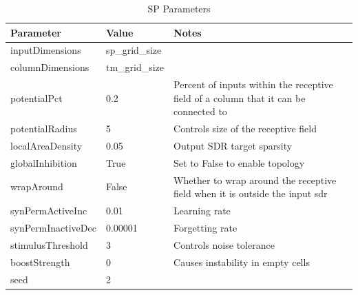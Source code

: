 \begin{table}[H]
    \centering
    \begin{tabularx}{\linewidth}{@{}XlX@{}}
        \toprule
        \textbf{Parameter} & \textbf{Value} & \textbf{Notes}                                                                       \\
        \midrule
        inputDimensions    & sp\_grid\_size &                                                                                      \\
        columnDimensions   & tm\_grid\_size &                                                                                      \\
        potentialPct       & 0.2            & Percent of inputs within the receptive field of a column that it can be connected to \\
        potentialRadius    & 5              & Controls size of the receptive field                                                 \\
        localAreaDensity   & 0.05           & Output SDR target sparsity                                                           \\
        globalInhibition   & True           & Set to False to enable topology                                                      \\
        wrapAround         & False          & Whether to wrap around the receptive field when it is outside the input \gls*{sdr}   \\
        synPermActiveInc   & 0.01           & Learning rate                                                                        \\
        synPermInactiveDec & 0.00001        & Forgetting rate                                                                      \\
        stimulusThreshold  & 3              & Controls noise tolerance                                                             \\
        boostStrength      & 0              & Causes instability in empty cells                                                    \\
        seed               & 2              &                                                                                      \\
        \bottomrule
    \end{tabularx}
    \caption{SP Parameters}
    \label{tab:surveillance_sp}
\end{table}
